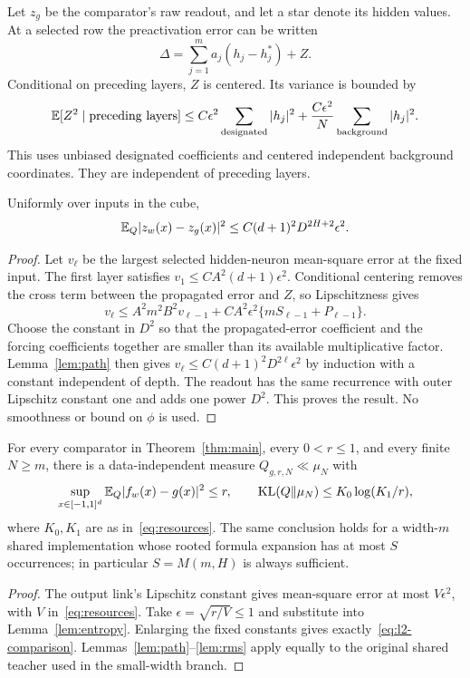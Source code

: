 Let $z_g$ be the comparator's raw readout, and let a star denote its hidden values. At a selected row the preactivation error can be written
\[
 \Delta=\sum_{j=1}^m a_j(h_j-h_j^*)+Z.
\]
Conditional on preceding layers, $Z$ is centered. Its variance is bounded by
\begin{equation}
 \mathbb E[Z^2\mid\text{preceding layers}]
 \le C\epsilon^2\sum_{\rm designated}|h_j|^2
       +\frac{C\epsilon^2}{N}\sum_{\rm background}|h_j|^2.
 \label{eq:new-noise-variance}
\end{equation}
This uses unbiased designated coefficients and centered independent background coordinates. They are independent of preceding layers.

\begin{lemma}\label{lem:rms}
Uniformly over inputs in the cube,
\begin{equation}
 \mathbb E_Q|z_w(x)-z_g(x)|^2
 \le C(d+1)^2D^{2H+2}\epsilon^2.
 \label{eq:raw-rms}
\end{equation}
\end{lemma}
\begin{proof}
Let $v_\ell$ be the largest selected hidden-neuron mean-square error at the fixed input. The first layer satisfies
$v_1\le CA^2(d+1)\epsilon^2$.
Conditional centering removes the cross term between the propagated error and $Z$, so Lipschitzness gives
\[
 v_\ell\le A^2m^2B^2v_{\ell-1}
          +CA^2\epsilon^2\{mS_{\ell-1}+P_{\ell-1}\}.
\]
Choose the constant in $D^2$ so that the propagated-error coefficient and the forcing coefficients together are smaller than its available multiplicative factor. Lemma~\ref{lem:path} then gives
$v_\ell\le C(d+1)^2D^{2\ell}\epsilon^2$ by induction with a constant independent of depth. The readout has the same recurrence with outer Lipschitz constant one and adds one power $D^2$. This proves the result. No smoothness or bound on $\phi$ is used.
\end{proof}

\begin{lemma}\label{lem:comparison}
For every comparator in Theorem~\ref{thm:main}, every $0<r\le1$, and every finite $N\ge m$, there is a data-independent measure $Q_{g,r,N}\ll\mu_N$ with
\begin{equation}
 \sup_{x\in[-1,1]^d}\mathbb E_Q|f_w(x)-g(x)|^2\le r,\qquad
 \operatorname{KL}(Q\|\mu_N)\le K_0\log(K_1/r),
 \label{eq:l2-comparison}
\end{equation}
where $K_0,K_1$ are as in~\eqref{eq:resources}. The same conclusion holds for a width-$m$ shared implementation whose rooted formula expansion has at most $S$ occurrences; in particular $S=M(m,H)$ is always sufficient.
\end{lemma}
\begin{proof}
The output link's Lipschitz constant gives mean-square error at most
$V\epsilon^2$, with $V$ in~\eqref{eq:resources}. Take
$\epsilon=\sqrt{r/V}\le1$ and substitute into Lemma~\ref{lem:entropy}. Enlarging the fixed constants gives exactly~\eqref{eq:l2-comparison}. Lemmas~\ref{lem:path}--\ref{lem:rms} apply equally to the original shared teacher used in the small-width branch.
\end{proof}

